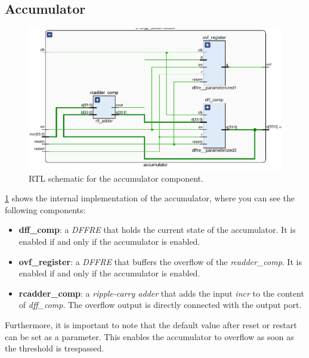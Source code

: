 \subsection{Accumulator}
\begin{figure}[]
  \centering
  \includegraphics[width=\textwidth]{figs/accumulator_schematic.pdf}
  \caption{RTL schematic for the accumulator component.}
  \label{fig:accumulator}
\end{figure}

\cref{fig:accumulator} shows the internal implementation of the accumulator, where you
can see the following components:
\begin{itemize}
  \item \textbf{dff\_comp}: a \emph{DFFRE} that holds the current state of the
    accumulator. It is enabled if and only if the accumulator is enabled.
  \item \textbf{ovf\_register}: a \emph{DFFRE} that buffers the overflow of the
    \emph{rcadder\_comp}. It is enabled if and only if the accumulator is enabled.
  \item \textbf{rcadder\_comp}: a \emph{ripple-carry adder} that adds the input
    \emph{incr} to the content of \emph{dff\_comp}. The overflow output is
    directly connected with the output port.
\end{itemize}

Furthermore, it is important to note that the default value after reset
or restart can be set as a parameter.
This enables the accumulator to overflow as soon as the threshold is trespassed.

